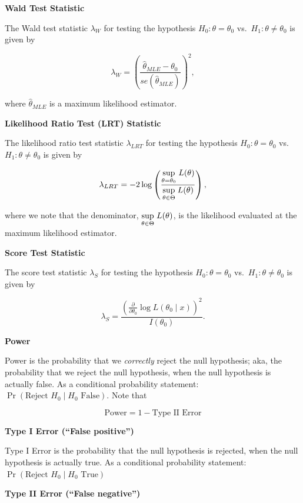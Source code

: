 \documentclass[
  letterpaper,
  DIV=11,
  numbers=noendperiod]{scrreprt}
\begin{document}
\textbf{Wald Test Statistic}

The Wald test statistic \(\lambda_W\) for testing the hypothesis
\(H_0: \theta = \theta_0\) vs.~\(H_1: \theta \neq \theta_0\) is given by

\[
\lambda_W = \left(\frac{\hat{\theta}_{MLE} - \theta_0}{se(\hat{\theta}_{MLE})}\right)^2,
\]

where \(\hat{\theta}_{MLE}\) is a maximum likelihood estimator.

\textbf{Likelihood Ratio Test (LRT) Statistic}

The likelihood ratio test statistic \(\lambda_{LRT}\) for testing the
hypothesis \(H_0: \theta = \theta_0\) vs.~\(H_1: \theta \neq \theta_0\)
is given by

\[
\lambda_{LRT} = -2 \log\left(\frac{\underset{\theta = \theta_0}{\text{sup}} \hspace{1mm} L(\theta)}{\underset{\theta \in \Theta}{\text{sup}} \hspace{1mm} L(\theta)}\right),
\]

where we note that the denominator,
\(\underset{\theta \in \Theta}{\text{sup}} \hspace{1mm} L(\theta)\), is
the likelihood evaluated at the maximum likelihood estimator.

\textbf{Score Test Statistic}

The score test statistic \(\lambda_S\) for testing the hypothesis
\(H_0: \theta = \theta_0\) vs.~\(H_1: \theta \neq \theta_0\) is given by

\[
\lambda_S = \frac{\left( \frac{\partial}{\partial \theta_0} \log L(\theta_0 \mid x) \right)^2}{I(\theta_0)}.
\]

\textbf{Power}

Power is the probability that we \emph{correctly} reject the null
hypothesis; aka, the probability that we reject the null hypothesis,
when the null hypothesis is actually false. As a conditional probability
statement: \(\Pr(\text{Reject }H_0 \mid H_0 \text{ False})\). Note that

\[
\text{Power} = 1 - \text{Type II Error}
\]

\textbf{Type I Error (``False positive'')}

Type I Error is the probability that the null hypothesis is rejected,
when the null hypothesis is actually true. As a conditional probability
statement: \(\Pr(\text{Reject }H_0 \mid H_0 \text{ True})\)

\textbf{Type II Error (``False negative'')}
\end{document}
